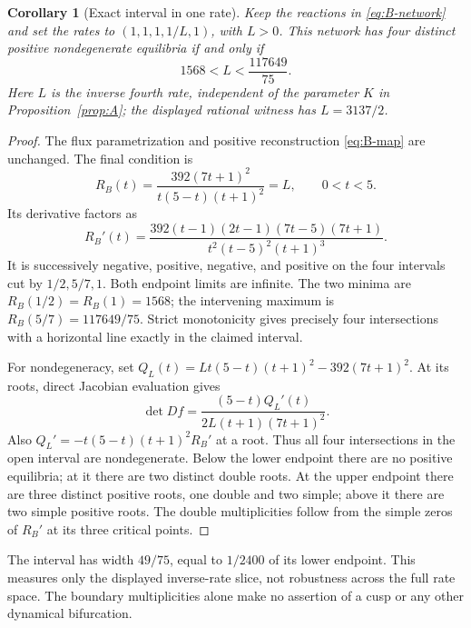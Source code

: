 \documentclass[11pt]{article}
\newtheorem{corollary}{Corollary}
\begin{document}
\begin{corollary}[Exact interval in one rate]\label{cor:B-window}
Keep the reactions in \eqref{eq:B-network} and set the rates to $(1,1,1,1/L,1)$, with $L>0$. This network has four distinct positive nondegenerate equilibria if and only if
\[
1568<L<\frac{117649}{75}.
\]
Here $L$ is the inverse fourth rate, independent of the parameter $K$ in Proposition~\ref{prop:A}; the displayed rational witness has $L=3137/2$.
\end{corollary}
\begin{proof}
The flux parametrization and positive reconstruction \eqref{eq:B-map} are unchanged. The final condition is
\[
R_B(t)=\frac{392(7t+1)^2}{t(5-t)(t+1)^2}=L,\qquad0<t<5.
\]
Its derivative factors as
\[
R_B'(t)=\frac{392(t-1)(2t-1)(7t-5)(7t+1)}{t^2(t-5)^2(t+1)^3}.
\]
It is successively negative, positive, negative, and positive on the four intervals cut by $1/2,5/7,1$. Both endpoint limits are infinite. The two minima are $R_B(1/2)=R_B(1)=1568$; the intervening maximum is $R_B(5/7)=117649/75$. Strict monotonicity gives precisely four intersections with a horizontal line exactly in the claimed interval.

For nondegeneracy, set $Q_L(t)=Lt(5-t)(t+1)^2-392(7t+1)^2$. At its roots, direct Jacobian evaluation gives
\[
\det Df=\frac{(5-t)Q_L'(t)}{2L(t+1)(7t+1)^2}.
\]
Also $Q_L'=-t(5-t)(t+1)^2R_B'$ at a root. Thus all four intersections in the open interval are nondegenerate. Below the lower endpoint there are no positive equilibria; at it there are two distinct double roots. At the upper endpoint there are three distinct positive roots, one double and two simple; above it there are two simple positive roots. The double multiplicities follow from the simple zeros of $R_B'$ at its three critical points.
\end{proof}
The interval has width $49/75$, equal to $1/2400$ of its lower endpoint. This measures only the displayed inverse-rate slice, not robustness across the full rate space. The boundary multiplicities alone make no assertion of a cusp or any other dynamical bifurcation.
\end{document}

